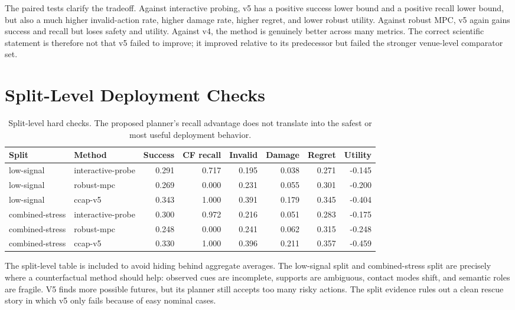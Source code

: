 \documentclass{article}
\begin{document}
The paired tests clarify the tradeoff. Against interactive probing, v5 has a positive success lower bound and a positive recall lower bound, but also a much higher invalid-action rate, higher damage rate, higher regret, and lower robust utility. Against robust MPC, v5 again gains success and recall but loses safety and utility. Against v4, the method is genuinely better across many metrics. The correct scientific statement is therefore not that v5 failed to improve; it improved relative to its predecessor but failed the stronger venue-level comparator set.

\section{Split-Level Deployment Checks}

\begin{table}[t]
\centering
\small
\begin{tabular}{llrrrrrr}
\toprule
Split & Method & Success & CF recall & Invalid & Damage & Regret & Utility \\
\midrule
low-signal & interactive-probe & 0.291 & 0.717 & 0.195 & 0.038 & 0.271 & -0.145 \\
low-signal & robust-mpc & 0.269 & 0.000 & 0.231 & 0.055 & 0.301 & -0.200 \\
low-signal & ccap-v5 & 0.343 & 1.000 & 0.391 & 0.179 & 0.345 & -0.404 \\
combined-stress & interactive-probe & 0.300 & 0.972 & 0.216 & 0.051 & 0.283 & -0.175 \\
combined-stress & robust-mpc & 0.248 & 0.000 & 0.241 & 0.062 & 0.315 & -0.248 \\
combined-stress & ccap-v5 & 0.330 & 1.000 & 0.396 & 0.211 & 0.357 & -0.459 \\
\bottomrule
\end{tabular}
\caption{Split-level hard checks. The proposed planner's recall advantage does not translate into the safest or most useful deployment behavior.}
\label{tab:split}
\end{table}


The split-level table is included to avoid hiding behind aggregate averages. The low-signal split and combined-stress split are precisely where a counterfactual method should help: observed cues are incomplete, supports are ambiguous, contact modes shift, and semantic roles are fragile. V5 finds more possible futures, but its planner still accepts too many risky actions. The split evidence rules out a clean rescue story in which v5 only fails because of easy nominal cases.
\end{document}
